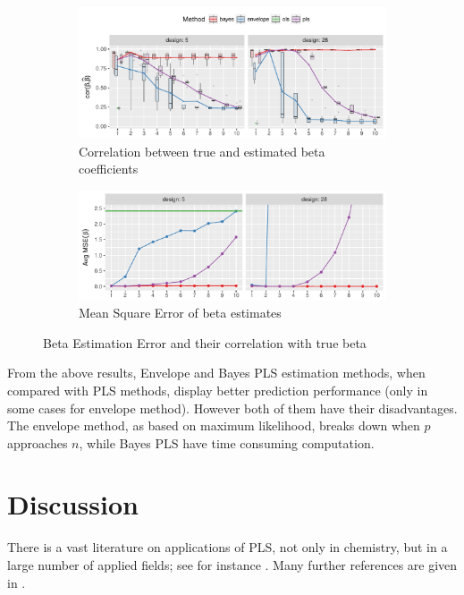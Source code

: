 \documentclass[a4paper, 11pt]{article}
\begin{document}
\begin{figure}[!ht]
  \centering
  \begin{subfigure}[b]{\textwidth}
    \centering
    \includegraphics[width=\textwidth]{beta-corr-plot-selected.pdf}
    \caption{Correlation between true and estimated beta coefficients}
    \label{fig:corr-beta}
  \end{subfigure}
  \begin{subfigure}[b]{\textwidth}
    \centering
    \includegraphics[width=\textwidth]{beta-error.pdf}
    \caption{Mean Square Error of beta estimates}
    \label{fig:beta-err}
  \end{subfigure}
  \caption{Beta Estimation Error and their correlation with true beta}
  \label{fig:est-error-combined}
\end{figure}

From the above results, Envelope and Bayes PLS estimation methods, when compared with PLS methods, display better prediction performance (only in some cases for envelope method). However both of them have their disadvantages. The envelope method, as based on maximum likelihood, breaks down when $p$ approaches $n$, while Bayes PLS have time consuming computation.

\section{Discussion}
There is a vast literature on applications of PLS, not only in chemistry, but in a large number of applied fields; see for instance \citet{boulesteix2007partial}. Many further references are given in \citet{mehmood2016diversity}.
\end{document}
